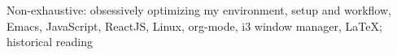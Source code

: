 \documentclass[10pt,a4paper]{article} %
\begin{document}
\spacedhrule{1.6em}{-0.4em} %


\inlineheadsection %
{Non-exhaustive:}
{obsessively optimizing my environment, setup and workflow, Emacs, JavaScript, ReactJS, Linux, org-mode, i3 window manager, \LaTeX; historical reading}

\end{document}

